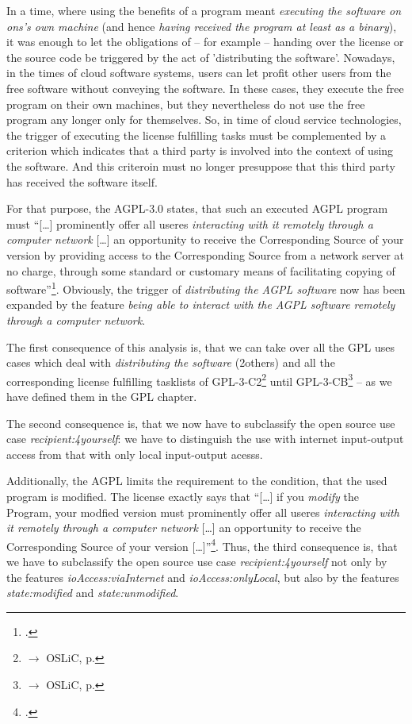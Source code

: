 In a time, where using the benefits of a program meant \emph{executing the
software on ons's own machine} (and hence \emph{having received the program at
least as a binary}), it was enough to let the obligations of -- for example --
handing over the license or the source code be triggered by the act of
'distributing the software'. Nowadays, in the times of cloud software systems,
users can let profit other users from the free software without conveying the
software. In these cases, they  execute the free program on their own machines,
but they nevertheless do not use the free program any longer only for
themselves. So, in time of cloud service technologies, the trigger of executing
the license fulfilling tasks must be complemented by a criterion which indicates
that a third party is involved into the context of using the software. And this
criteroin must no longer presuppose that this third party has received the
software itself.

For that purpose, the AGPL-3.0 states, that such an executed AGPL program must
\enquote{[\ldots] prominently offer all useres \emph{interacting with it
remotely through a computer network} [\ldots] an opportunity to receive the
Corresponding Source of your version by providing access to the Corresponding
Source from a network server at no charge, through some standard or customary
means of facilitating copying of software}\footcite[cf.][\nopage wp.
§13]{Agpl30OsiLicense2007a}. Obviously, the trigger of \emph{distributing the
AGPL software} now has been expanded by the feature \emph{being able to interact
with the AGPL software remotely through a computer network}.

The first consequence of this analysis is, that we can take over all the GPL
uses cases which deal with \emph{distributing the software} (2others) and all
the corresponding license fulfilling tasklists of
GPL-3-C2\footnote{$\rightarrow$ OSLiC, p. \pageref{OSUC-02S-GPL3}} until
GPL-3-CB\footnote{$\rightarrow$ OSLiC, p. \pageref{OSUC-10B-GPL3}} -- as we have
defined them in the GPL chapter.

The second consequence is, that we now have to subclassify the open source use
case \emph{recipient:4yourself}: we have to distinguish the use with internet
input-output access from that with only local input-output acesss.

Additionally, the AGPL limits the requirement to the condition, that the used
program is modified. The license exactly says that \enquote{[\ldots] if you
\emph{modify} the Program, your modfied version must prominently offer all
useres \emph{interacting with it remotely through a computer network} [\ldots]
an opportunity to receive the Corresponding Source of your version
[\ldots]}\footcite[cf.][\nopage wp. §13]{Agpl30OsiLicense2007a}. Thus, the third
consequence is, that we have to subclassify the open source use case 
\emph{recipient:4yourself} not only by the features \emph{ioAccess:viaInternet}
and \emph{ioAccess:onlyLocal}, but also by the features
\emph{state:modified} and \emph{state:unmodified}.

